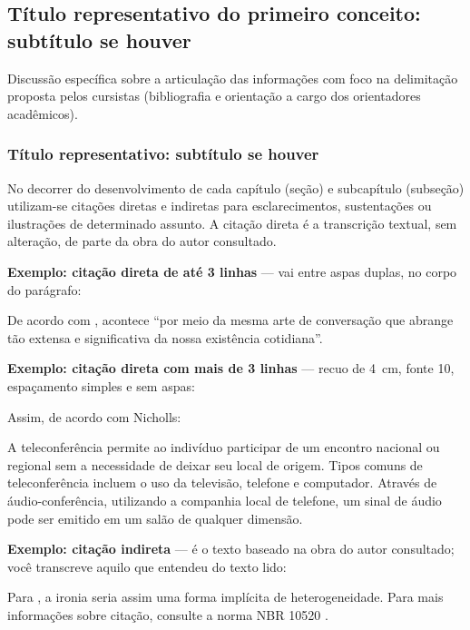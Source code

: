 \subsection{Título representativo do primeiro conceito: subtítulo se houver}

Discussão específica sobre a articulação das informações com foco na delimitação
proposta pelos cursistas (bibliografia e orientação a cargo dos orientadores
acadêmicos).

\subsubsection{Título representativo: subtítulo se houver}

No decorrer do desenvolvimento de cada capítulo (seção) e subcapítulo (subseção)
utilizam-se citações diretas e indiretas para esclarecimentos, sustentações ou
ilustrações de determinado assunto. A citação direta é a transcrição textual, sem
alteração, de parte da obra do autor consultado.

\textbf{Exemplo: citação direta de até 3 linhas} --- vai entre aspas duplas, no
corpo do parágrafo:

De acordo com , acontece ``por meio da mesma arte de
conversação que abrange tão extensa e significativa da nossa existência
cotidiana''.

\textbf{Exemplo: citação direta com mais de 3 linhas} --- recuo de 4~cm, fonte
10, espaçamento simples e sem aspas:

Assim, de acordo com Nicholls:

\begin{citacao}
A teleconferência permite ao indivíduo participar de um encontro nacional ou
regional sem a necessidade de deixar seu local de origem. Tipos comuns de
teleconferência incluem o uso da televisão, telefone e computador. Através de
áudio-conferência, utilizando a companhia local de telefone, um sinal de áudio
pode ser emitido em um salão de qualquer dimensão. \parencite[p.~181]{nicholls1993}
\end{citacao}

\textbf{Exemplo: citação indireta} --- é o texto baseado na obra do autor
consultado; você transcreve aquilo que entendeu do texto lido:

Para , a ironia seria assim uma forma implícita de
heterogeneidade. Para mais informações sobre citação, consulte a norma
NBR 10520 \parencite{abnt10520}.

